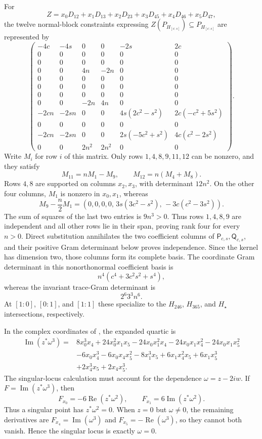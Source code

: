 \documentclass[11pt,a4paper]{article}
\begin{document}
For
\[
Z=x_0D_{12}+x_1D_{13}+x_2D_{23}+x_3D_{45}+x_4D_{46}+x_5D_{47},
\]
the twelve normal-block constraints expressing $Z(P_{H_{[c:s]}})\subseteq P_{H_{[c:s]}}$ are represented by
\[
\renewcommand{\arraystretch}{1.05}
\begin{pmatrix}
-4c&-4s&0&0&-2s&2c\\
0&0&0&0&0&0\\
0&0&0&0&0&0\\
0&0&4n&-2n&0&0\\
0&0&0&0&0&0\\
0&0&0&0&0&0\\
0&0&0&0&0&0\\
0&0&-2n&4n&0&0\\
-2cn&-2sn&0&0&4s(2c^2-s^2)&2c(-c^2+5s^2)\\
0&0&0&0&0&0\\
-2cn&-2sn&0&0&2s(-5c^2+s^2)&4c(c^2-2s^2)\\
0&0&2n^2&2n^2&0&0
\end{pmatrix}.
\]
Write $M_i$ for row $i$ of this matrix.  Only rows $1,4,8,9,11,12$
can be nonzero, and they satisfy
\[
M_{11}=nM_1-M_9,\qquad M_{12}=n(M_4+M_8).
\]
Rows $4,8$ are supported on columns $x_2,x_3$, with determinant $12n^2$.
On the other four columns, $M_1$ is nonzero in $x_0,x_1$, whereas
\[
M_9-\frac n2M_1
=(0,0,0,0,\,3s(3c^2-s^2),\,-3c(c^2-3s^2)).
\]
The sum of squares of the last two entries is $9n^3>0$.
Thus rows $1,4,8,9$ are independent and all other rows lie in their span,
proving rank four for every $n>0$.
Direct substitution annihilates the two coefficient columns of
$\mathsf P_{c,s},\mathsf Q_{c,s}$, and their positive Gram determinant below
proves independence.  Since the kernel has dimension two, those columns
form its complete basis.  The coordinate Gram determinant in this nonorthonormal coefficient basis is
\[
n^4(c^4+3c^2s^2+s^4),
\]
whereas the invariant trace-Gram determinant is
\[
2^6 3^3n^6.
\]
At $[1:0]$, $[0:1]$, and $[1:1]$ these specialize to the $H_{246}$, $H_{365}$, and $H_\star$ intersections, respectively.

In the complex coordinates of , the expanded quartic is
\begin{align*}
\operatorname{Im}(z^\ast\omega^3)={}&8x_0^3x_4+24x_0^2x_1x_5-24x_0x_1^2x_4
-24x_0x_1x_4^2-24x_0x_1x_5^2\\
&-6x_0x_4^3-6x_0x_4x_5^2-8x_1^3x_5
+6x_1x_4^2x_5+6x_1x_5^3\\
&+2x_4^3x_5+2x_4x_5^3.
\end{align*}
The singular-locus calculation must account for the dependence $\omega=z-2iw$.  If $F=\operatorname{Im}(z^\ast\omega^3)$, then
\[
F_{x_0}=-6\operatorname{Re}(z^\ast\omega^2),
\qquad
F_{x_1}=6\operatorname{Im}(z^\ast\omega^2).
\]
Thus a singular point has $z^\ast\omega^2=0$.  When $z=0$ but $\omega\ne0$, the remaining derivatives are $F_{x_4}=\operatorname{Im}(\omega^3)$ and $F_{x_5}=-\operatorname{Re}(\omega^3)$, so they cannot both vanish.  Hence the singular locus is exactly $\omega=0$.
\end{document}
